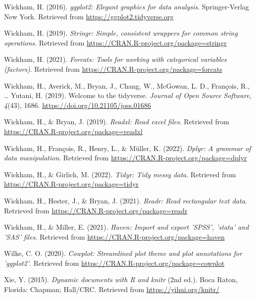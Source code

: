 \documentclass[
  man]{apa6}
\newlength{\cslhangindent}
\newlength{\cslentryspacingunit} %
\newenvironment{CSLReferences}[2] %
 {%
  \setlength{\parindent}{0pt}
  \ifodd #1
  \let\oldpar\par
  \def\par{\hangindent=\cslhangindent\oldpar}
  \fi
  \setlength{\parskip}{#2\cslentryspacingunit}
 }%
 {}
\begin{document}
\begin{CSLReferences}{1}{0}
\leavevmode{}%
Wickham, H. (2016). \emph{ggplot2: Elegant graphics for data analysis}. Springer-Verlag New York. Retrieved from \url{https://ggplot2.tidyverse.org}

\leavevmode{}%
Wickham, H. (2019). \emph{Stringr: Simple, consistent wrappers for common string operations}. Retrieved from \url{https://CRAN.R-project.org/package=stringr}

\leavevmode{}%
Wickham, H. (2021). \emph{Forcats: Tools for working with categorical variables (factors)}. Retrieved from \url{https://CRAN.R-project.org/package=forcats}

\leavevmode{}%
Wickham, H., Averick, M., Bryan, J., Chang, W., McGowan, L. D., François, R., \ldots{} Yutani, H. (2019). Welcome to the {tidyverse}. \emph{Journal of Open Source Software}, \emph{4}(43), 1686. \url{https://doi.org/10.21105/joss.01686}

\leavevmode{}%
Wickham, H., \& Bryan, J. (2019). \emph{Readxl: Read excel files}. Retrieved from \url{https://CRAN.R-project.org/package=readxl}

\leavevmode{}%
Wickham, H., François, R., Henry, L., \& Müller, K. (2022). \emph{Dplyr: A grammar of data manipulation}. Retrieved from \url{https://CRAN.R-project.org/package=dplyr}

\leavevmode{}%
Wickham, H., \& Girlich, M. (2022). \emph{Tidyr: Tidy messy data}. Retrieved from \url{https://CRAN.R-project.org/package=tidyr}

\leavevmode{}%
Wickham, H., Hester, J., \& Bryan, J. (2021). \emph{Readr: Read rectangular text data}. Retrieved from \url{https://CRAN.R-project.org/package=readr}

\leavevmode{}%
Wickham, H., \& Miller, E. (2021). \emph{Haven: Import and export 'SPSS', 'stata' and 'SAS' files}. Retrieved from \url{https://CRAN.R-project.org/package=haven}

\leavevmode{}%
Wilke, C. O. (2020). \emph{Cowplot: Streamlined plot theme and plot annotations for 'ggplot2'}. Retrieved from \url{https://CRAN.R-project.org/package=cowplot}

\leavevmode{}%
Xie, Y. (2015). \emph{Dynamic documents with {R} and knitr} (2nd ed.). Boca Raton, Florida: Chapman; Hall/CRC. Retrieved from \url{https://yihui.org/knitr/}


\end{CSLReferences}
\end{document}
